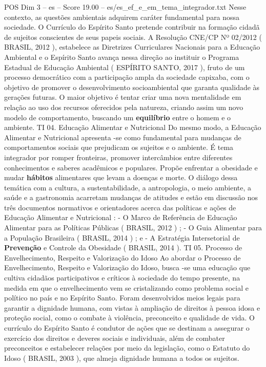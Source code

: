 \begin{textsample}{POS Dim 3 – es – Score 19.00 – es/es\_ef\_e\_em\_tema\_integrador.txt}
Nesse contexto, as questões ambientais adquirem caráter fundamental para nossa sociedade.
O Currículo do Espírito Santo pretende contribuir na formação cidadã de sujeitos conscientes de seus papeis sociais.
A Resolução CNE/CP Nº 02/2012 ( BRASIL, 2012 ), estabelece as Diretrizes Curriculares Nacionais para a Educação Ambiental e o Espírito Santo avança nessa direção ao instituir o Programa Estadual de Educação Ambiental ( ESPÍRITO SANTO, 2017 ), fruto de um processo democrático com a participação ampla da sociedade capixaba, com o objetivo de promover o desenvolvimento socioambiental que garanta qualidade às gerações futuras.
O maior objetivo é tentar criar uma nova mentalidade em relação ao uso dos recursos oferecidos pela natureza, criando assim um novo modelo de comportamento, buscando um \textbf{equilíbrio} entre o homem e o ambiente.
TI 04.
Educação Alimentar e Nutricional Do mesmo modo, a Educação Alimentar e Nutricional apresenta -se como fundamental para mudanças de comportamentos sociais que prejudicam os sujeitos e o ambiente.
É tema integrador por romper fronteiras, promover intercâmbios entre diferentes conhecimentos e saberes acadêmicos e populares.
Propõe enfrentar a obesidade e mudar \textbf{hábitos} alimentares que levam a doenças e morte.
O diálogo dessa temática com a cultura, a sustentabilidade, a antropologia, o meio ambiente, a saúde e a gastronomia acarretam mudanças de atitudes e estão em discussão nos três documentos normativos e orientadores acerca das políticas e ações de Educação Alimentar e Nutricional : - O Marco de Referência de Educação Alimentar para as Políticas Públicas ( BRASIL, 2012 ) ; - O Guia Alimentar para a População Brasileira ( BRASIL, 2014 ) ; e - A Estratégia Intersetorial de \textbf{Prevenção} e Controle da Obesidade ( BRASIL, 2014 ).
TI 05.
Processo de Envelhecimento, Respeito e Valorização do Idoso Ao abordar o Processo de Envelhecimento, Respeito e Valorização do Idoso, busca -se uma educação que cultiva cidadãos participativos e críticos à sociedade do tempo presente, na medida em que o envelhecimento vem se cristalizando como problema social e político no país e no Espírito Santo.
Foram desenvolvidos meios legais para garantir a dignidade humana, com vistas à ampliação de direitos à pessoa idosa e proteção social, como o combate à violência, preconceito e qualidade de vida.
O currículo do Espírito Santo é condutor de ações que se destinam a assegurar o exercício dos direitos e deveres sociais e individuais, além de combater preconceitos e estabelecer relações por meio da legislação, como o Estatuto do Idoso ( BRASIL, 2003 ), que almeja dignidade humana a todos os sujeitos.

\end{textsample}
